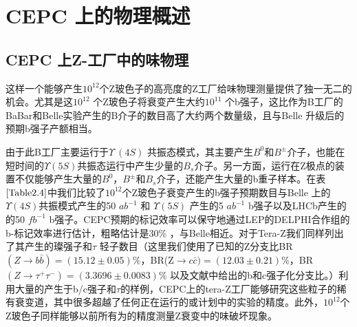 \newcommand{\RNum}[1]{\uppercase\expandafter{\romannumeral #1\relax}}
\chapter{CEPC 上的物理概述}\label{chap:overview}

\section{CEPC 上Z-工厂中的味物理}\label{Sec:2.5}

这样一个能够产生$10^{12} $个Z玻色子的高亮度的Z工厂给味物理测量提供了独一无二的机会。尤其是这$10^{12}$ 个Z玻色子将衰变产生大约$10^{11}$ 个b强子，这比作为B工厂的BaBar和Belle实验产生的B介子的数目高了大约两个数量级，且与Belle \RNum{2}升级后的预期b强子产额相当。

由于此B工厂主要运行于$\Upsilon\ (4S)$ 共振态模式，其主要产生$B^0$和$B^\pm$介子，也能在短时间的$\Upsilon(5S)$共振态运行中产生少量的$B_s$介子。另一方面，运行在Z极点的装置不仅能够产生大量的$B^0$，$B^\pm$和$B_s$介子，还能产生大量的b重子样本。在表$\ref{Table2.4}$中我们比较了$10^{12}$个Z玻色子衰变产生的b强子预期数目与Belle \RNum{2}上的$\Upsilon(4S)$共振模式产生的50 $ab^{-1}$ 和 $\Upsilon(5S)$ 产生的5 $ab^{-1}$ b强子以及LHCb产生的的50 $fb^{-1}$ b强子。CEPC预期的标记效率可以保守地通过LEP的DELPHI合作组的b-标记效率进行估计，粗略估计是30\% ，与Belle\RNum{2}相近。对于Tera-Z我们同样列出了其产生的璨强子和$\tau$ 轻子数目（这里我们使用了已知的Z分支比BR$(Z\to b\bar{b})=(15.12\pm 0.05)\%$，BR(Z$\to c\bar{c})=(12.03\pm 0.21)\%$，BR$(Z\to \tau^+\tau^-)=(3.3696\pm0.0083)\%$ 以及文献中给出的b和c强子化分支比。）利用大量的产生于b/c强子和$\tau$的样例，CEPC上的tera-Z工厂能够研究这些粒子的稀有衰变道，其中很多超越了任何正在运行的或计划中的实验的精度。此外，$10^{12}$个Z玻色子同样能够以前所有为的精度测量Z衰变中的味破坏现象。

